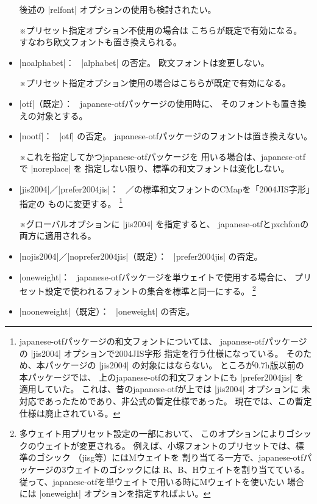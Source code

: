\documentclass[uplatex,dvipdfmx,a4paper]{jsarticle}
\newcommand{\Pkg}[1]{\textsf{#1}}
\newcommand{\Note}{\par\noindent ※}
\newcommand{\Means}{：\ }
\providecommand{\Strong}[1]{\textsf{#1}}
\begin{document}
\begin{itemize}
  後述の |relfont| オプションの使用も検討されたい。
  \Note プリセット指定オプション\Strong{不使用}の場合は
  こちらが既定で有効になる。
  すなわち\Strong{欧文フォントも置き換えられる}。
\item |noalphabet|\Means
  |alphabet| の否定。
  欧文フォントは変更しない。
  \Note プリセット指定オプション使用の場合はこちらが既定で有効になる。
\item |otf|（既定）\Means
  \Pkg{japanese-otf}パッケージの使用時に、
  そのフォントも置き換えの対象とする。
\item |nootf|\Means
  |otf| の否定。
  \Pkg{japanese-otf}パッケージのフォントは置き換えない。
  \Note これを指定してかつ\Pkg{japanese-otf}パッケージを
  用いる場合は、\Pkg{japanese-otf}で |noreplace| を
  指定しない限り、標準の和文フォントは変化しない。
\item |jis2004|／|prefer2004jis|\Means
  {\pTeX}／{\upTeX}の標準和文フォントのCMapを「2004JIS字形」指定の
  ものに変更する。
  \footnote{\Pkg{japanese-otf}パッケージの和文フォントについては、
    \Pkg{japanese-otf}パッケージの |jis2004| オプションで2004JIS字形
    指定を行う仕様になっている。
    そのため、本パッケージの |jis2004| の対象にはならない。
    ところが0.7h版以前の本パッケージでは、
    {\upTeX}上の\Pkg{japanese-otf}の和文フォントにも |prefer2004jis| を
    適用していた。
    これは、昔の\Pkg{japanese-otf}が{\upTeX}上では |jis2004| オプションに
    未対応であったためであり、非公式の暫定仕様であった。
    現在では、この暫定仕様は廃止されている。}
  \Note グローバルオプションに |jis2004| を指定すると、
  \Pkg{japanese-otf}と\Pkg{pxchfon}の両方に適用される。
\item |nojis2004|／|noprefer2004jis|（既定）\Means
  |prefer2004jis| の否定。
\item |oneweight|\Means
  \Pkg{japanese-otf}パッケージを単ウェイトで使用する場合に、
  プリセット設定で使われるフォントの集合を{\pTeX}標準と同一にする。
  \footnote{多ウェイト用プリセット設定の一部において、
  このオプションによりゴシックのウェイトが変更される。
  例えば、小塚フォントのプリセットでは、{\pTeX}標準のゴシック
  （jisg等）にはMウェイトを
  割り当てる一方で、\Pkg{japanese-otf}パッケージの3ウェイトのゴシックには
  R、B、Hウェイトを割り当てている。
  従って、\Pkg{japanese-otf}を単ウェイトで用いる時にMウェイトを使いたい
  場合には |oneweight| オプションを指定すればよい。}
\item |nooneweight|（既定）\Means
  |oneweight| の否定。
\end{itemize}
\end{document}
